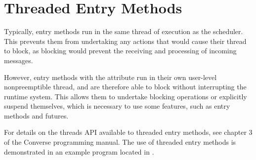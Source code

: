 \section{Threaded Entry Methods}
\label{threaded}

Typically, entry methods run in the same thread of execution as the \charmpp
scheduler. This prevents them from undertaking any actions that would cause
their thread to block, as blocking would prevent the receiving and processing of
incoming messages.

However, entry methods with the  attribute run in their own
user-level nonpreemptible thread, and are therefore able to block without
interrupting the runtime system. This allows them to undertake blocking
operations or explicitly suspend themselves, which is necessary to use some
\charmpp features, such as  entry methods and futures.

For details on the threads API available to threaded entry methods, see chapter
3 of the Converse programming manual. The use of threaded entry methods is
demonstrated in an example program located in
.
